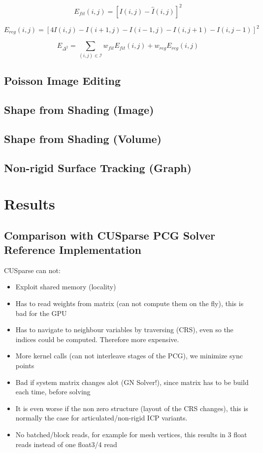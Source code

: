 \documentclass[review]{acmsiggraph}
\begin{document}
$$E_{\mathit{fit}}(i,j) = [I(i,j) - \hat{I}(i,j) ]^2$$

$$E_{\mathit{reg}}(i,j) = [4 I(i,j) - I(i+1,j) - I(i-1,j) - I(i,j+1) - I(i,j-1)]^2$$

$$E_{\Delta^2} = \sum_{(i,j) \in \mathcal{I}} w_{\mathit{fit}} E_{\mathit{fit}}(i,j) + w_{\mathit{reg}} E_{\mathit{reg}}(i,j)$$

\subsection{Poisson Image Editing}

\cite{perez2003poisson}

\subsection{Shape from Shading (Image)}

\cite{wu2014sfs}

\subsection{Shape from Shading (Volume)}

\subsection{Non-rigid Surface Tracking (Graph)}

\cite{zollhoefer2014deformable}



\section{Results}

\subsection{Comparison with CUSparse PCG Solver Reference Implementation}

CUSparse can not:
\begin{itemize}
\item Exploit shared memory (locality)
\item Has to read weights from matrix (can not compute them on the fly), this is bad for the GPU
\item Has to navigate to neighbour variables by traversing (CRS), even so the indices could be computed. Therefore more expensive.
\item More kernel calls (can not interleave stages of the PCG), we minimize sync points
\item Bad if system matrix changes alot (GN Solver!), since matrix has to be build each time, before solving
\item It is even worse if the non zero structure (layout of the CRS changes), this is normally the case for articulated/non-rigid ICP variants.
\item No batched/block reads, for example for mesh vertices, this results in 3 float reads instead of one float3/4 read
\end{itemize}




\nocite{*}

\end{document}

